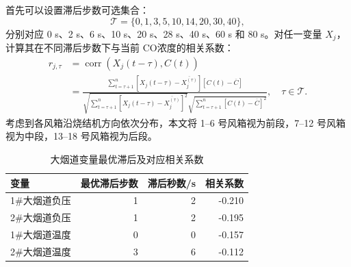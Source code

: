 \documentclass[UTF8,a4paper,zihao=-4]{ctexart}
\newcommand{\CO}{CO}
\begin{document}
首先可以设置滞后步数可选集合：
\begin{equation}
\mathcal{T}=\{0,1,3,5,10,14,20,30,40\},
\end{equation}
分别对应 0 s、2 s、6 s、10 s、20 s、28 s、40 s、60 s 和 80 s。对任一变量 $X_j$，计算其在不同滞后步数下与当前 \CO 浓度的相关系数：
\begin{equation}
\begin{aligned}
r_{j,\tau}
&=\operatorname{corr}\left(X_j(t-\tau),C(t)\right)\\
&=
\frac{
\sum_{t=\tau+1}^{n}
\left[X_j(t-\tau)-\overline{X_j^{(\tau)}}\right]
\left[C(t)-\overline C\right]
}{
\sqrt{\sum_{t=\tau+1}^{n}
\left[X_j(t-\tau)-\overline{X_j^{(\tau)}}\right]^2}
\sqrt{\sum_{t=\tau+1}^{n}
\left[C(t)-\overline C\right]^2}
},\quad \tau\in\mathcal{T}.
\end{aligned}
\end{equation}
考虑到各风箱沿烧结机方向依次分布，本文将 1--6 号风箱视为前段，7--12 号风箱视为中段，13--18 号风箱视为后段。
\begin{table}[H]
\centering
\caption{大烟道变量最优滞后及对应相关系数}
\begin{tabular}{lrrr}
\toprule
变量 & 最优滞后步数 & 滞后秒数/s & 相关系数 \\
\midrule
1\#大烟道负压 & 1 & 2 & -0.210 \\
2\#大烟道负压 & 1 & 2 & -0.195 \\
1\#大烟道温度 & 0 & 0 & -0.157 \\
2\#大烟道温度 & 3 & 6 & -0.112 \\
\bottomrule
\end{tabular}
\end{table}
\end{document}
